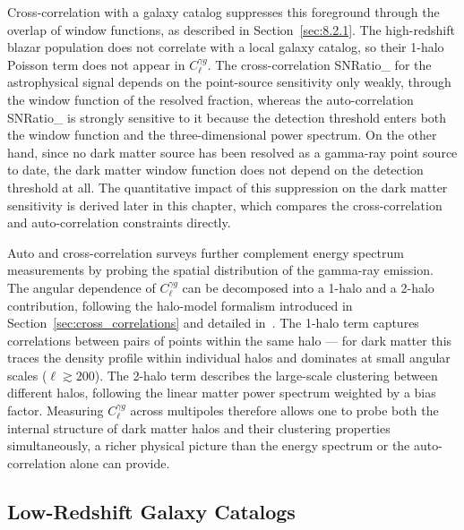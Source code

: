 Cross-correlation with a galaxy catalog suppresses this foreground through the overlap of window functions, as described in Section~\ref{sec:8.2.1}.
The high-redshift blazar population does not correlate with a local galaxy catalog, so their 1-halo Poisson term does not appear in $C_\ell^{\gamma g}$.
The cross-correlation \gls{SNRatio_} for the astrophysical signal depends on the point-source sensitivity only weakly, through the window function of the resolved fraction, whereas the auto-correlation \gls{SNRatio_} is strongly sensitive to it because the detection threshold enters both the window function and the three-dimensional power spectrum.
On the other hand, since no dark matter source has been resolved as a gamma-ray point source to date, the dark matter window function does not depend on the detection threshold at all.
The quantitative impact of this suppression on the dark matter sensitivity is derived later in this chapter, which compares the cross-correlation and auto-correlation constraints directly.

Auto and cross-correlation surveys further complement energy spectrum measurements by probing the spatial distribution of the gamma-ray emission.
The angular dependence of $C_\ell^{\gamma g}$ can be decomposed into a 1-halo and a 2-halo contribution, following the halo-model formalism introduced in Section~\ref{sec:cross_correlations} and detailed in~\cite{Camera:2012cj,DGRB-review}.
The 1-halo term captures correlations between pairs of points within the same halo --- for dark matter this traces the density profile within individual halos and dominates at small angular scales ($\ell \gtrsim 200$).
The 2-halo term describes the large-scale clustering between different halos, following the linear matter power spectrum weighted by a bias factor.
Measuring $C_\ell^{\gamma g}$ across multipoles therefore allows one to probe both the internal structure of dark matter halos and their clustering properties simultaneously, a richer physical picture than the energy spectrum or the auto-correlation alone can provide.

\subsection{Low-Redshift Galaxy Catalogs}
\label{sec:8.2.3}

